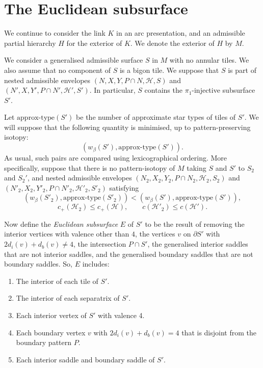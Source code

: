\documentclass[oneside]{amsart}
\numberwithin{equation}{section}
\theoremstyle{plain}
\theoremstyle{definition}
\begin{document}
\section{The Euclidean subsurface}
\label{Sec:Euclidean}

We continue to consider the link $K$ in an arc presentation, and an admissible partial hierarchy $H$ for
the exterior of $K$. We denote the exterior of $H$ by $M$.

We consider a generalised admissible surface $S$ in $M$ with no annular tiles. 
We also assume that no component of $S$ is a bigon tile. We suppose that
$S$ is part of nested admissible envelopes $(N, X, Y, P \cap N, \mathcal{H}, S)$ and $(N', X, Y', P \cap N', \mathcal{H}', S')$.
In particular, $S$ contains the $\pi_1$-injective subsurface $S'$.

Let $\text{approx-type}(S')$ be the number of approximate star types of tiles of $S'$. 
We will suppose that the
following quantity is minimised, up to pattern-preserving isotopy:
$$(w_\beta(S'), \text{approx-type}(S')).$$
As usual, such pairs are compared using lexicographical ordering. More specifically, suppose
that there is no pattern-isotopy of $M$ taking $S$ and $S'$ to $S_2$ and $S_2'$, and nested admissible envelopes 
$(N_2, X_2, Y_2, P \cap N_2, \mathcal{H}_2, S_2)$ and $(N'_2,  X_2, Y'_2, P \cap N'_2, \mathcal{H}'_2, S'_2)$ satisfying
$$(w_\beta(S'_2), \text{approx-type}(S'_2)) < (w_\beta(S'), \text{approx-type}(S')),$$
$$c_+(\mathcal{H}_2) \leq c_+(\mathcal{H}), \qquad c(\mathcal{H}'_2) \leq c(\mathcal{H}').$$

Now define the \emph{Euclidean subsurface} $E$ of $S'$ to be the result of removing
the interior vertices with valence other than $4$, the vertices $v$ on $\partial S'$ with $2d_i(v) + d_b(v) \not= 4$, the intersection $P \cap S'$, the generalised interior saddles 
that are not interior saddles, and the generalised boundary saddles that are not boundary saddles. So, $E$ includes:
\begin{enumerate}
\item The interior of each tile of $S'$.
\item The interior of each separatrix of $S'$.
\item Each interior vertex of $S'$ with valence 4.
\item Each boundary vertex $v$ with $2d_i(v) + d_b(v) = 4$ that is disjoint from the boundary pattern $P$.
\item Each interior saddle and boundary saddle of $S'$.
\end{enumerate}
\end{document}
